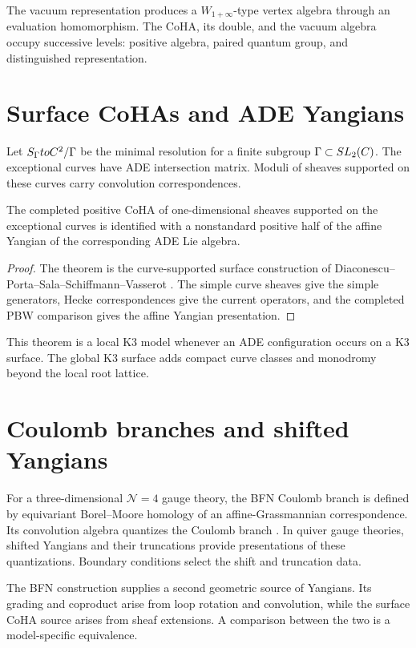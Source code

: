 The vacuum representation produces a $W_{1+\infty}$-type vertex algebra through an evaluation homomorphism. The CoHA, its double, and the vacuum algebra occupy successive levels: positive algebra, paired quantum group, and distinguished representation.

\chapter{Surface CoHAs and ADE Yangians}
Let $S_\Gamma toC^2/\Gamma$ be the minimal resolution for a finite subgroup $\Gamma\subset SL_2(C)$. The exceptional curves have ADE intersection matrix. Moduli of sheaves supported on these curves carry convolution correspondences.

\begin{theorem}
The completed positive CoHA of one-dimensional sheaves supported on the exceptional curves is identified with a nonstandard positive half of the affine Yangian of the corresponding ADE Lie algebra.
\end{theorem}
\begin{proof}
The theorem is the curve-supported surface construction of Diaconescu--Porta--Sala--Schiffmann--Vasserot \cite{DPPSSV}. The simple curve sheaves give the simple generators, Hecke correspondences give the current operators, and the completed PBW comparison gives the affine Yangian presentation.
\end{proof}

This theorem is a local K3 model whenever an ADE configuration occurs on a K3 surface. The global K3 surface adds compact curve classes and monodromy beyond the local root lattice.

\chapter{Coulomb branches and shifted Yangians}
For a three-dimensional $\mathcal N=4$ gauge theory, the BFN Coulomb branch is defined by equivariant Borel--Moore homology of an affine-Grassmannian correspondence. Its convolution algebra quantizes the Coulomb branch \cite{BFN}. In quiver gauge theories, shifted Yangians and their truncations provide presentations of these quantizations. Boundary conditions select the shift and truncation data.

The BFN construction supplies a second geometric source of Yangians. Its grading and coproduct arise from loop rotation and convolution, while the surface CoHA source arises from sheaf extensions. A comparison between the two is a model-specific equivalence.

